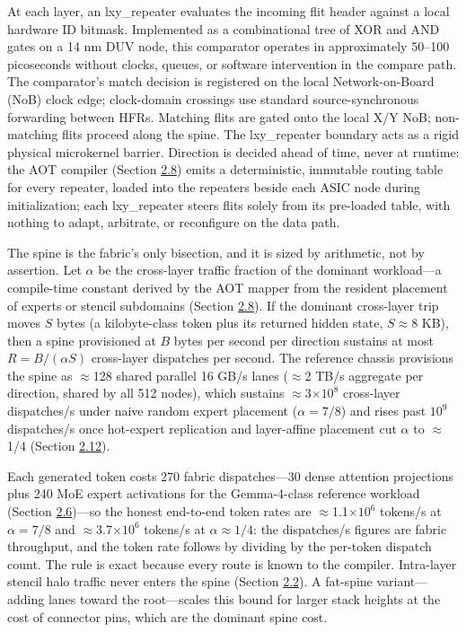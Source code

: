 \documentclass[12pt,onecolumn]{article}
\begin{document}
At each layer, an lxy\_repeater evaluates the incoming flit header against a local hardware ID bitmask. Implemented as a combinational tree of XOR and AND gates on a 14 nm DUV node, this comparator operates in approximately 50--100 picoseconds without clocks, queues, or software intervention in the compare path. The comparator's match decision is registered on the local Network-on-Board (NoB) clock edge; clock-domain crossings use standard source-synchronous forwarding between HFRs. Matching flits are gated onto the local X/Y NoB; non-matching flits proceed along the spine. The lxy\_repeater boundary acts as a rigid physical microkernel barrier\cite{9}. Direction is decided ahead of time, never at runtime: the AOT compiler (Section \hyperref[sec:2.8]{2.8}) emits a deterministic, immutable routing table for every repeater, loaded into the repeaters beside each ASIC node during initialization; each lxy\_repeater steers flits solely from its pre-loaded table, with nothing to adapt, arbitrate, or reconfigure on the data path.

The spine is the fabric's only bisection, and it is sized by arithmetic, not by assertion. Let $\alpha$ be the cross-layer traffic fraction of the dominant workload---a compile-time constant derived by the AOT mapper from the resident placement of experts or stencil subdomains (Section \hyperref[sec:2.8]{2.8}). If the dominant cross-layer trip moves $S$ bytes (a kilobyte-class token plus its returned hidden state, $S \approx 8$ KB), then a spine provisioned at $B$ bytes per second per direction sustains at most $R = B / (\alpha S)$ cross-layer dispatches per second. The reference chassis provisions the spine as $\approx$128 shared parallel 16 GB/s lanes ($\approx$2 TB/s aggregate per direction, shared by all 512 nodes), which sustains $\approx$3$\times10^{8}$ cross-layer dispatches/s under naive random expert placement ($\alpha = 7/8$) and rises past $10^{9}$ dispatches/s once hot-expert replication and layer-affine placement cut $\alpha$ to $\approx$1/4 (Section \hyperref[sec:2.12]{2.12}).

Each generated token costs 270 fabric dispatches---30 dense attention projections plus 240 MoE expert activations for the Gemma-4-class reference workload (Section \hyperref[sec:2.6]{2.6})---so the honest end-to-end token rates are $\approx$1.1$\times10^{6}$ tokens/s at $\alpha = 7/8$ and $\approx$3.7$\times10^{6}$ tokens/s at $\alpha \approx 1/4$: the dispatches/s figures are fabric throughput, and the token rate follows by dividing by the per-token dispatch count. The rule is exact because every route is known to the compiler. Intra-layer stencil halo traffic never enters the spine (Section \hyperref[sec:2.2]{2.2}). A fat-spine variant---adding lanes toward the root---scales this bound for larger stack heights at the cost of connector pins, which are the dominant spine cost.
\end{document}
